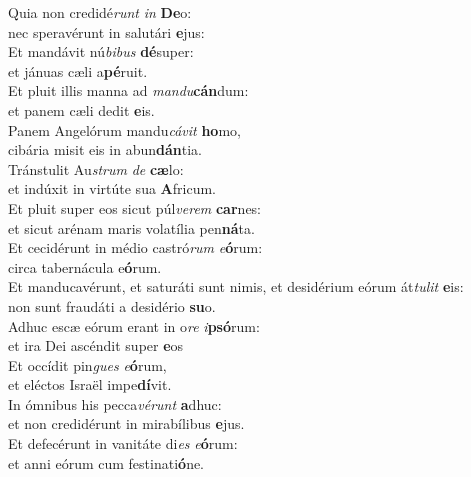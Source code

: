 \evenverse Quia non credidé\textit{runt} \textit{in} \textbf{De}o:~\*\\
\evenverse nec speravérunt in salutári \textbf{e}jus:\\
\oddverse Et mandávit nú\textit{bi}\textit{bus} \textbf{dé}super:~\*\\
\oddverse et jánuas cæli a\textbf{pé}ruit.\\
\evenverse Et pluit illis manna ad \textit{man}\textit{du}\textbf{cán}dum:~\*\\
\evenverse et panem cæli dedit \textbf{e}is.\\
\oddverse Panem Angelórum mandu\textit{cá}\textit{vit} \textbf{ho}mo,~\*\\
\oddverse cibária misit eis in abun\textbf{dán}tia.\\
\evenverse Tránstulit Au\textit{strum} \textit{de} \textbf{cæ}lo:~\*\\
\evenverse et indúxit in virtúte sua \textbf{A}fricum.\\
\oddverse Et pluit super eos sicut púl\textit{ve}\textit{rem} \textbf{car}nes:~\*\\
\oddverse et sicut arénam maris volatília pen\textbf{ná}ta.\\
\evenverse Et cecidérunt in médio castró\textit{rum} \textit{e}\textbf{ó}rum:~\*\\
\evenverse circa tabernácula e\textbf{ó}rum.\\
\oddverse Et manducavérunt, et saturáti sunt nimis, et desidérium eórum át\textit{tu}\textit{lit} \textbf{e}is:~\*\\
\oddverse non sunt fraudáti a desidério \textbf{su}o.\\
\evenverse Adhuc escæ eórum erant in o\textit{re} \textit{i}\textbf{psó}rum:~\*\\
\evenverse et ira Dei ascéndit super \textbf{e}os\\
\oddverse Et occídit pin\textit{gues} \textit{e}\textbf{ó}rum,~\*\\
\oddverse et eléctos Israël impe\textbf{dí}vit.\\
\evenverse In ómnibus his pecca\textit{vé}\textit{runt} \textbf{a}dhuc:~\*\\
\evenverse et non credidérunt in mirabílibus \textbf{e}jus.\\
\oddverse Et defecérunt in vanitáte di\textit{es} \textit{e}\textbf{ó}rum:~\*\\
\oddverse et anni eórum cum festinati\textbf{ó}ne.\\
